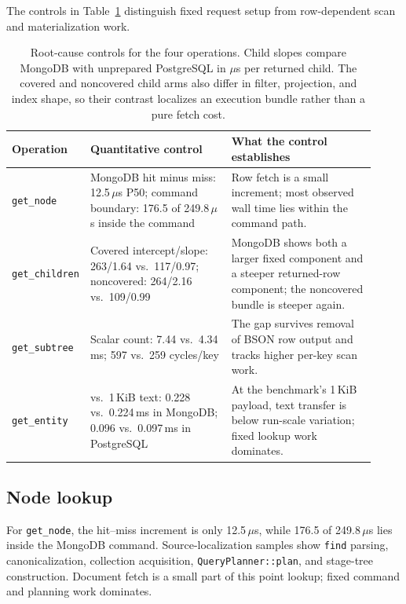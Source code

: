 \documentclass[10pt]{article}
\newcommand{\code}[1]{\texttt{#1}}
\newcommand{\hdr}{\rowcolor{hdrgray}}
\newenvironment{ctab}{\par\smallskip\centering\small
  \setlength{\tabcolsep}{5pt}\renewcommand{\arraystretch}{1.12}}{\par\smallskip}
\begin{document}
The controls in Table~\ref{tab:overhead-map} distinguish fixed request setup
from row-dependent scan and materialization work.

\begin{table}[H]
\caption{Root-cause controls for the four operations. Child slopes compare
MongoDB with unprepared PostgreSQL in $\mu$s per returned child. The covered and
noncovered child arms also differ in filter, projection, and index shape, so
their contrast localizes an execution bundle rather than a pure fetch cost.}
\label{tab:overhead-map}
\begin{ctab}
\scriptsize
\setlength{\tabcolsep}{4pt}
\begin{tabular}{@{}
  >{\raggedright\arraybackslash}p{0.13\linewidth}
  >{\raggedright\arraybackslash}p{0.39\linewidth}
  >{\raggedright\arraybackslash}p{0.40\linewidth}@{}}
\toprule
\hdr Operation & Quantitative control & What the control establishes \\
\midrule
\code{get\_node} &
  MongoDB hit minus miss: 12.5\,$\mu$s P50; command boundary:
  176.5 of 249.8\,$\mu$s inside the command &
  Row fetch is a small increment; most observed wall time lies within the
  command path. \\
\code{get\_children} &
  Covered intercept/slope: 263/1.64 vs.\ 117/0.97; noncovered:
  264/2.16 vs.\ 109/0.99 &
  MongoDB shows both a larger fixed component and a steeper returned-row
  component; the noncovered bundle is steeper again. \\
\code{get\_subtree} &
  Scalar count: 7.44 vs.\ 4.34\,ms; 597 vs.\ 259 cycles/key &
  The gap survives removal of BSON row output and tracks higher per-key scan
  work. \\
\code{get\_entity} &
  0 vs.\ 1\,KiB text: 0.228 vs.\ 0.224\,ms in MongoDB;
  0.096 vs.\ 0.097\,ms in PostgreSQL &
  At the benchmark's 1\,KiB payload, text transfer is below run-scale
  variation; fixed lookup work dominates. \\
\bottomrule
\end{tabular}
\end{ctab}
\end{table}

\subsection{Node lookup}

For \code{get\_node}, the hit--miss increment is only 12.5\,$\mu$s, while
176.5 of 249.8\,$\mu$s lies inside the MongoDB command. Source-localization
samples show \code{find} parsing, canonicalization, collection acquisition,
\code{QueryPlanner::plan}, and stage-tree construction. Document fetch is a
small part of this point lookup; fixed command and planning work dominates.
\end{document}
